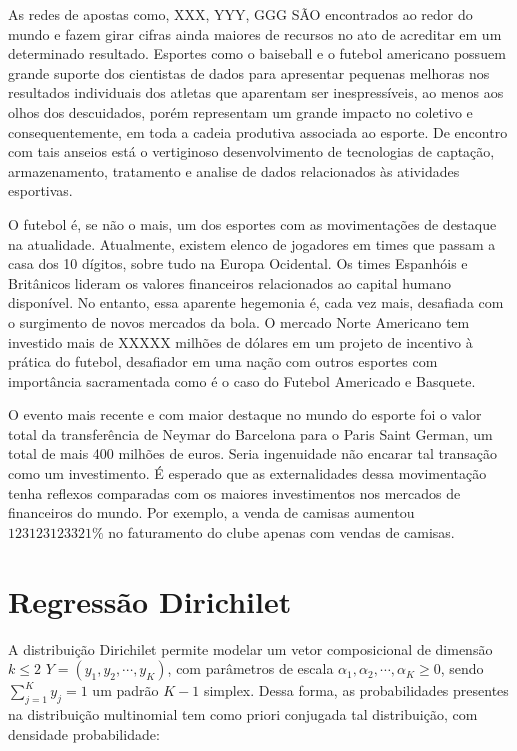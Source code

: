 \documentclass[doc,apacite,oneside,a4paper,12pt]{apa6}
\begin{document}
As redes de apostas como, XXX, YYY, GGG SÃO encontrados ao redor do mundo e fazem girar cifras ainda maiores de recursos no ato de acreditar em um determinado resultado. Esportes como o baiseball e o futebol americano possuem grande suporte dos cientistas de dados para apresentar pequenas melhoras nos resultados individuais dos atletas que aparentam ser inespressíveis, ao menos aos olhos dos descuidados, porém representam um grande impacto no coletivo e consequentemente, em toda a cadeia produtiva associada ao esporte. De encontro com tais anseios está o vertiginoso desenvolvimento de tecnologias de captação, armazenamento, tratamento e analise de dados relacionados às atividades esportivas.

O futebol é, se não o mais, um dos esportes com as movimentações de destaque na atualidade. Atualmente, existem elenco de jogadores em times que passam a casa dos 10 dígitos, sobre tudo na Europa Ocidental. Os times Espanhóis e Britânicos lideram os valores financeiros relacionados ao capital humano disponível. No entanto, essa aparente hegemonia é, cada vez mais, desafiada com o surgimento de novos mercados da bola. O mercado Norte Americano tem investido mais de XXXXX milhões de dólares em um projeto de incentivo à prática do futebol, desafiador em uma nação com outros esportes com importância sacramentada como é o caso do Futebol Americado e Basquete.

O evento mais recente e com maior destaque no mundo do esporte foi o valor total da transferência de Neymar do Barcelona para o Paris Saint German, um total de mais 400 milhões de euros. Seria ingenuidade não encarar tal transação como um investimento. É esperado que as externalidades dessa movimentação tenha reflexos comparadas com os maiores investimentos nos mercados de financeiros do mundo. Por exemplo, a venda de camisas aumentou $123123123321\%$ no faturamento do clube apenas com vendas de camisas.


\section{Regressão Dirichilet}
\label{sec:mod}
\noindent



A distribuição Dirichilet permite modelar um vetor composicional de dimensão $k\leq 2$ $Y = (y_1,y_2,\cdots,y_K)$, com parâmetros de escala $\alpha_1,\alpha_2,\cdots,\alpha_K\geq 0$, sendo $\sum_{j=1}^K y_j = 1$ um padrão $K-1$ simplex. Dessa forma, as probabilidades presentes na distribuição multinomial tem como priori conjugada tal distribuição, com densidade probabilidade:
\end{document}
